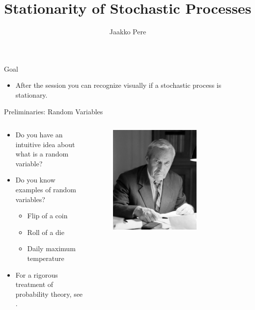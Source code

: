 \documentclass{beamer}
\title{Stationarity of Stochastic Processes}
\author{Jaakko Pere}
\date{\DTMdisplaydate{2023}{11}{06}{-1}}
\begin{document}
\frame{\titlepage}


\begin{frame}{Goal}
  \begin{itemize}
    \item After the session you can recognize visually if a stochastic
    process is stationary.
  \end{itemize}
\end{frame}


\begin{frame}{Preliminaries: Random Variables}
  \begin{columns}
    \begin{column}{0.47\textwidth}
        \begin{itemize}
          \item Do you have an intuitive idea about what is a random variable?
          \item Do you know examples of random variables?
          \pause
          \begin{itemize}
            \item Flip of a coin
            \pause
            \item Roll of a die
            \pause
            \item Daily maximum temperature
          \end{itemize}
          \pause
          \item For a rigorous treatment of probability theory, see
          \parencite{kallenberg1997}.
        \end{itemize}
    \end{column}
    \begin{column}{0.5\textwidth}
        \begin{figure}
          \centering
          \includegraphics[width=0.7\textwidth, height=0.85\textwidth]{kolmogorov.jpeg}

\end{figure}
\end{column}
\end{columns}
\end{frame}
\end{document}
